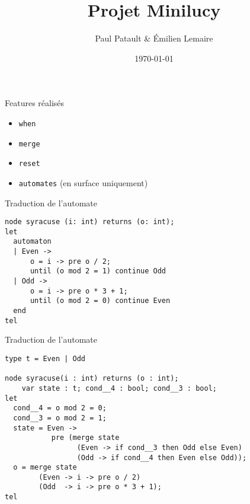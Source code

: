 \documentclass{beamer}
\title{Projet Minilucy}
\date{\today}
\author{Paul Patault \& Émilien Lemaire}
\institute{ENS Paris-Saclay}
\begin{document}
\maketitle


\begin{frame}{Features réalisés}
    \begin{itemize}[label=$\vcenter{\hbox{\scriptsize$\bullet$}}$]
        \item \texttt{when}
        \item \texttt{merge}
        \item \texttt{reset}
        \item \texttt{automates} (en surface uniquement)
    \end{itemize}
\end{frame}

\begin{frame}[fragile]{Traduction de l'automate}

\begin{lstlisting}
node syracuse (i: int) returns (o: int);
let
  automaton
  | Even ->
      o = i -> pre o / 2;
      until (o mod 2 = 1) continue Odd
  | Odd ->
      o = i -> pre o * 3 + 1;
      until (o mod 2 = 0) continue Even
  end
tel
\end{lstlisting}

\end{frame}

\begin{frame}[fragile]{Traduction de l'automate}

\begin{lstlisting}
type t = Even | Odd

node syracuse(i : int) returns (o : int);
    var state : t; cond__4 : bool; cond__3 : bool;
let
  cond__4 = o mod 2 = 0;
  cond__3 = o mod 2 = 1;
  state = Even ->
           pre (merge state
                 (Even -> if cond__3 then Odd else Even)
                 (Odd -> if cond__4 then Even else Odd));
  o = merge state
        (Even -> i -> pre o / 2)
        (Odd  -> i -> pre o * 3 + 1);
tel
\end{lstlisting}

\end{frame}

\end{document}
